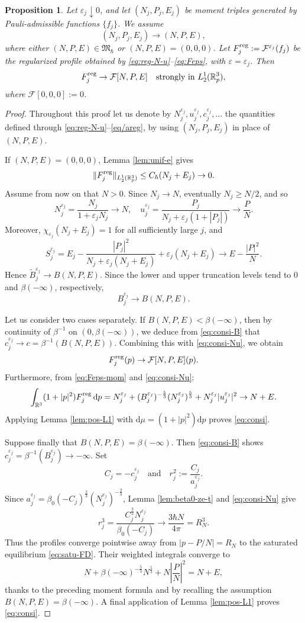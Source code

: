 \documentclass[10pt,reqno]{amsart}
\numberwithin{equation}{section}
\newtheorem{proposition}{Proposition}[section]
\theoremstyle{definition}
\newcommand{\R}{\mathbb R}
\newcommand{\dpp}{\mathrm{d}p}
\newcommand{\e}{\varepsilon}
\newcommand{\calF}{\mathcal F}
\newcommand{\bq}{\begin{equation}}
\newcommand{\eq}{\end{equation}}
\newcommand{\lt}{\left}
\newcommand{\rt}{\right}
\begin{document}
\begin{proposition}\label{prop:consist}
Let $\e_j\downarrow0$, and let $(N_j,P_j,E_j)$ be moment triples generated by Pauli-admissible functions $\{f_j\}$. We assume
\[
 (N_j,P_j,E_j)\to(N,P,E),
\]
where either $(N,P,E)\in\mathfrak M_\hbar$ or $(N,P,E)=(0,0,0)$. Let $F_j^{\rm reg} := \calF^{\e_j}(f_j)$ be the regularized profile obtained by \eqref{eq:reg-N-u}--\eqref{eq:Feps}, with $\e=\e_j$. Then
\bq \label{eq:consi}
 F_j^{\rm reg}\to\calF[N,P,E] \quad\text{strongly in }L^1_2(\R^3_p),
\eq
where $\calF[0,0,0]:=0$.
\end{proposition}

\begin{proof}
Throughout this proof let us denote by $N_j^{\e_j},u_j^{\e_j},c^{\e_j}_j,\ldots$ the quantities defined through \eqref{eq:reg-N-u}--\eqref{eq/areg}, by using $(N_j,P_j,E_j)$ in place of $(N,P,E)$.

If $(N,P,E)=(0,0,0)$, Lemma \ref{lem:unif-e} gives
\[
 \|F_j^{\rm reg}\|_{L^1_2(\R^3_p)}  \leq C_\hbar(N_j+E_j)\to0.
\]
Assume from now on that $N>0$. Since $N_j\to N$, eventually $N_j\geq N/2$, and so
\bq \label{eq:consi-Nu}
 N_j^{\e_j}=\frac{N_j}{1+\e_jN_j}\to N,  \quad  u_j^{\e_j}=\frac{P_j}{N_j+\e_j(1+|P_j|)}\to\frac PN.
\eq
Moreover, $\chi_{\e_j}(N_j+E_j)=1$ for all sufficiently large $j$, and
\[
 S_j^{\e_j} =E_j-\frac{|P_j|^2}{N_j+\e_j(N_j+E_j)}    +\e_j(N_j+E_j) \to E-\frac{|P|^2}{N}.
\]
Hence $\widetilde B_j^{\e_j}\to B(N,P,E)$.  Since the lower and upper truncation levels tend to $0$ and $\beta(-\infty)$, respectively,
\bq \label{eq:consi-B}
 B_j^{\e_j}\to B(N,P,E).
\eq

Let us consider two cases separately. If $B(N,P,E)<\beta(-\infty)$, then by continuity of $\beta^{-1}$ on $(0,\beta(-\infty))$, we deduce from \eqref{eq:consi-B} that $c^{\e_j}_j \to c = \beta^{-1}(B(N,P,E))$. Combining this with \eqref{eq:consi-Nu}, we obtain 
\[
 F_j^{\rm reg}(p)\to\calF[N,P,E](p).
\]
Furthermore, from \eqref{eq:Feps-mom} and \eqref{eq:consi-Nu}:
\[
 \int_{\R^3}(1+|p|^2)F_j^{\rm reg}\,\dpp =N_j^{\e_j}  +(B_j^{\e_j})^{-\frac53}(N_j^{\e_j})^{\frac53}  +N_j^{\e_j}|u_j^{\e_j}|^2 \to N+E.
\]
Applying Lemma \ref{lem:pos-L1} with $\mathrm{d}\mu=(1+|p|^2)\dpp$ proves \eqref{eq:consi}.

Suppose finally that $B(N,P,E)=\beta(-\infty)$. Then \eqref{eq:consi-B} shows $c_j^{\e_j}=\beta^{-1}(B_j^{\e_j})\to-\infty$.  Set  
\[
C_j=-c_j^{\e_j} \quad \text{and} \quad  r_j^2:=\frac{C_j}{a_j^{\e_j}}.
\]
Since $a_j^{\e_j}  =\beta_0(-C_j)^{\frac23}(N_j^{\e_j})^{-\frac23}$, Lemma \ref{lem:beta0-ze-t} and \eqref{eq:consi-Nu} give
\[
 r_j^3  =\frac{C_j^{\frac32}N_j^{\e_j}}{\beta_0(-C_j)}  \to\frac{3\hbar N}{4\pi}=R_N^3.
\]
Thus the profiles converge pointwise away from $|p-P/N|=R_N$ to the saturated equilibrium \eqref{eq:satu-FD}.  Their weighted integrals converge to
\[
 N+\beta(-\infty)^{-\frac53}N^{\frac53}+N\lt|\frac PN\rt|^2=N+E,
\]
thanks to the preceding moment formula and by recalling the assumption $B(N,P,E)=\beta(-\infty)$. A final application of Lemma \ref{lem:pos-L1} proves \eqref{eq:consi}.
\end{proof}
\end{document}
